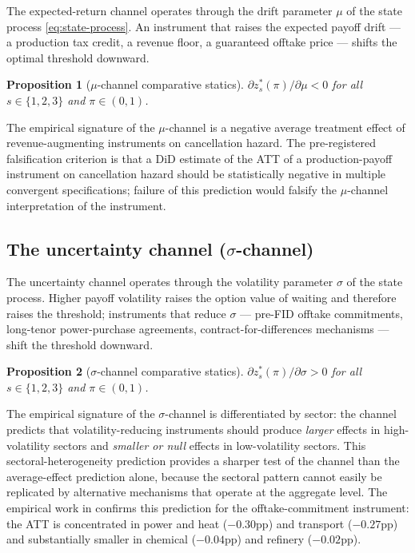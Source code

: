 \documentclass[12pt,a4paper]{article}
\theoremstyle{plain}
\newtheorem{proposition}{Proposition}
\theoremstyle{definition}
\begin{document}
The expected-return channel operates through the drift parameter $\mu$ of the state process \eqref{eq:state-process}. An instrument that raises the expected payoff drift --- a production tax credit, a revenue floor, a guaranteed offtake price --- shifts the optimal threshold downward.

\begin{proposition}[$\mu$-channel comparative statics]
\label{prop:mu-channel}
$\partial z^{*}_{s}(\pi) / \partial \mu < 0$ for all $s \in \{1, 2, 3\}$ and $\pi \in (0, 1)$.
\end{proposition}
\noindent The empirical signature of the $\mu$-channel is a negative average treatment effect of revenue-augmenting instruments on cancellation hazard. The pre-registered falsification criterion is that a DiD estimate of the ATT of a production-payoff instrument on cancellation hazard should be statistically negative in multiple convergent specifications; failure of this prediction would falsify the $\mu$-channel interpretation of the instrument.

\subsection{The uncertainty channel ($\sigma$-channel)}
\label{sec:channel-sigma}

The uncertainty channel operates through the volatility parameter $\sigma$ of the state process. Higher payoff volatility raises the option value of waiting and therefore raises the threshold; instruments that reduce $\sigma$ --- pre-FID offtake commitments, long-tenor power-purchase agreements, contract-for-differences mechanisms --- shift the threshold downward.

\begin{proposition}[$\sigma$-channel comparative statics]
\label{prop:sigma-channel}
$\partial z^{*}_{s}(\pi) / \partial \sigma > 0$ for all $s \in \{1, 2, 3\}$ and $\pi \in (0, 1)$.
\end{proposition}
\noindent The empirical signature of the $\sigma$-channel is differentiated by sector: the channel predicts that volatility-reducing instruments should produce \emph{larger} effects in high-volatility sectors and \emph{smaller or null} effects in low-volatility sectors. This sectoral-heterogeneity prediction provides a sharper test of the channel than the average-effect prediction alone, because the sectoral pattern cannot easily be replicated by alternative mechanisms that operate at the aggregate level. The empirical work in \cite{saakstra2026paper3} confirms this prediction for the offtake-commitment instrument: the ATT is concentrated in power and heat ($-0.30$pp) and transport ($-0.27$pp) and substantially smaller in chemical ($-0.04$pp) and refinery ($-0.02$pp).
\end{document}

